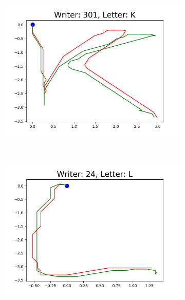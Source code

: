 \begin{figure}
\begin{subfigure}[b]{0.17\textwidth}
          \includegraphics[width=\textwidth]{images/framework/comparison_figures/K_301.png}
      \end{subfigure}
      ~
      \begin{subfigure}[b]{0.17\textwidth}
          \includegraphics[width=\textwidth]{images/framework/comparison_figures/L_24.png}
      \end{subfigure}
      ~
      \begin{subfigure}[b]{0.17\textwidth}

\end{subfigure}
\end{figure}
